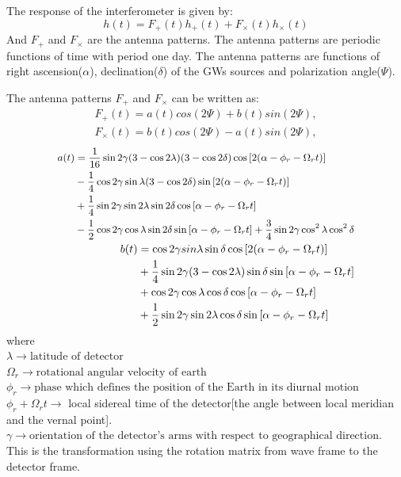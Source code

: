 \documentclass{ttuthes2007}
\begin{document}
The response of the interferometer is given by:
\begin{equation}
h(t) = F_+(t) h_+(t) + F_\times(t) h_\times(t) 
\end{equation}
And $F_+$ and $F_\times$ are the antenna patterns. The antenna patterns are periodic
functions of time with period one day. The antenna patterns are 
functions of right ascension($\alpha$), declination($\delta$) of the \acp{GW}
sources and polarization angle($\Psi$). 

The antenna patterns $F_+$ and $F_\times$ can be written as:
\begin{align*}
F_+(t) = a(t)cos(2\Psi) + b(t) sin(2\Psi),\\
F_\times(t) = b(t)cos(2\Psi) - a(t) sin(2\Psi),
\end{align*}
\begin{align}
\small
\begin{split}\label{eq:a}
a(t) &=
\frac{1}{16}\sin{2\gamma}(3-\cos{2\lambda})(3-\cos{2\delta})\cos{[2(\alpha-\phi_r-\Omega_rt)]}\\
&-\frac{1}{4}\cos{2\gamma} \sin{\lambda} (3-\cos{2\delta})
\sin{[2(\alpha-\phi_r-\Omega_rt)]}\\
&+\frac{1}{4}\sin{2\gamma} \sin{2\lambda} \sin{2\delta}
\cos{[\alpha-\phi_r-\Omega_r t]} \\
&-\frac{1}{2}\cos{2\gamma} \cos{\lambda} \sin{2\delta}
\sin{[\alpha-\phi_r-\Omega_r t]}
+\frac{3}{4} \sin{2\gamma} \cos^2{\lambda} \cos^2{\delta}
\end{split}\\
\begin{split}\label{eq:b}
b(t)& =\cos{2\gamma} sin{\lambda} \sin{\delta} \cos{[2(\alpha-\phi_r-\Omega_r
t)]}\\ 
&+\frac{1}{4} \sin{2\gamma} (3-\cos{2\lambda}) \sin{\delta}
\sin{[\alpha-\phi_r-\Omega_rt]}\\
&+ \cos{2\gamma} \cos{\lambda} \cos{\delta} \cos{[\alpha-\phi_r-\Omega_r t]}\\
&+\frac{1}{2}\sin{2\gamma} \sin{2\lambda} \cos{\delta}
\sin{[\alpha-\phi_r-\Omega_rt]}
\end{split}
\end{align}
where\\
$\lambda \rightarrow \text{latitude of detector}$\\
$\Omega_r \rightarrow \text{rotational angular velocity of earth}$\\
$\phi_r \rightarrow \text{phase which defines the position of the Earth in its
diurnal motion}$\\
$\phi_r + \Omega_r t \rightarrow$ local sidereal time of the detector[the
angle between local meridian and the vernal point].\\
$\gamma \rightarrow \text{orientation of the detector's arms with respect to
geographical direction.}$\\
This is the transformation using the rotation matrix from wave frame to the
detector frame. 
\end{document}
